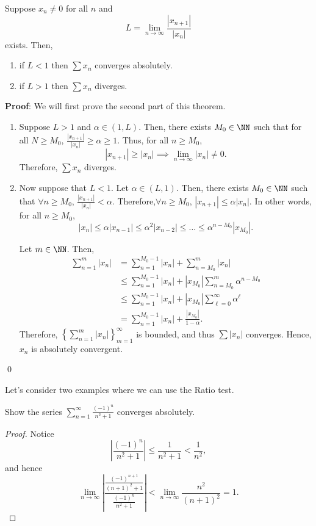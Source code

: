\begin{theorem}
Suppose $x_n \neq 0$ for all $n$ and 
\[
L = \lim_{n\to \infty} \frac{|x_{n+1}|}{|x_n|}
\]
exists. Then,
\begin{enumerate}
\item if $L<1$ then $\sum x_n$ converges absolutely. 
\item if $L>1$ then $\sum x_n$ diverges.
\end{enumerate}
\end{theorem}
\textbf{Proof}: We will first prove the second part of this theorem. 
\begin{enumerate}
    \item[2)] Suppose $L >1$ and $\alpha \in (1,L)$. Then, there exists $M_0 \in \NN$ such that for all $N\geq M_0$, $\frac{|x_{n+1}|}{|x_n|} \geq \alpha \geq 1$. Thus, for all $n\geq M_0$,
\[
|x_{n+1}| \geq |x_n| \implies \lim_{n\to \infty} |x_n| \neq 0.
\]
Therefore, $\sum x_n$ diverges.

\item[1)] Now suppose that $L<1$. Let $\alpha \in (L,1)$. Then, there exists $M_0 \in \NN$ such that $\forall n\geq M_0$, $\frac{|x_{n+1}|}{|x_n|}< \alpha$. Therefore,$\forall n\geq M_0$, $|x_{n+1}| \leq \alpha |x_n|$. In other words, for all $n\geq M_0$,
\[
|x_n| \leq \alpha |x_{n-1}| \leq\alpha^2 |x_{n-2}| \leq \dots \leq \alpha^{n-M_0} |x_{M_0}|.
\]

Let $m\in \NN$. Then, 
\begin{align*}
    \sum_{n=1}^m |x_n| &= \sum_{n=1}^{M_0-1} |x_n| + \sum_{n=M_0}^m |x_n| \\
    &\leq \sum_{n=1}^{M_0-1} |x_n| + |x_{M_0}|\sum_{n=M_0}^m \alpha^{n-M_0} \\
    &\leq \sum_{n=1}^{M_0-1} |x_n| + |x_{M_0}| \sum_{\ell = 0}^\infty \alpha^\ell \\
    &= \sum_{n=1}^{M_0-1} |x_n| + \frac{|x_{M_0}|}{1-\alpha}.
\end{align*}
Therefore, $\left\{\sum_{n=1}^m |x_n|\right\}_{m=1}^\infty$ is bounded, and thus $\sum |x_n|$ converges. Hence, $x_n$ is absolutely convergent.
\end{enumerate}\qed 

Let's consider two examples where we can use the Ratio test.
\begin{example}
Show the series $\sum_{n=1}^\infty \frac{(-1)^n}{n^2 + 1}$ converges absolutely.
\end{example}
\begin{proof}
Notice
    \[
    \left|\frac{(-1)^n}{n^2+1}\right| \leq \frac{1}{n^2 + 1} < \frac{1}{n^2},
    \]
    and hence 
    \[
    \lim_{n\to \infty} \left|\frac{\frac{(-1)^{n+1}}{(n+1)^2+1}}{\frac{(-1)^{n}}{n^2+1}}\right| < \lim_{n\to \infty} \frac{n^2}{(n+1)^2} = 1.
    \]
\end{proof}

